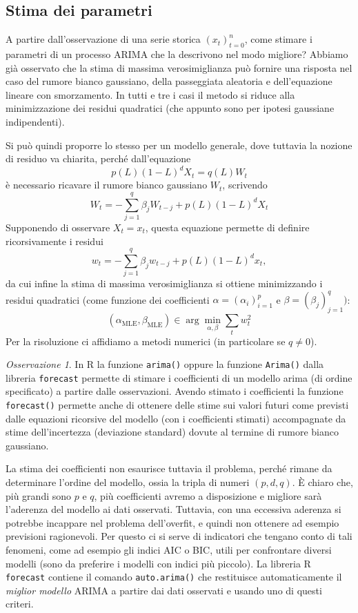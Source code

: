 \documentclass[
  italian,
  letterpaper,
]{book}
\newcommand{\mle}{\operatorname{MLE}}
\theoremstyle{definition}
\theoremstyle{remark}
\newtheorem*{remark}{Osservazione}
\begin{document}
\subsection{Stima dei parametri}\label{stima-dei-parametri}

A partire dall'osservazione di una serie storica \((x_t)_{t=0}^n\), come
stimare i parametri di un processo ARIMA che la descrivono nel modo
migliore? Abbiamo già osservato che la stima di massima verosimiglianza
può fornire una risposta nel caso del rumore bianco gaussiano, della
passeggiata aleatoria e dell'equazione lineare con smorzamento. In tutti
e tre i casi il metodo si riduce alla minimizzazione dei residui
quadratici (che appunto sono per ipotesi gaussiane indipendenti).

Si può quindi proporre lo stesso per un modello generale, dove tuttavia
la nozione di residuo va chiarita, perché dall'equazione
\[ p(L)(1-L)^d X_t = q(L)W_t\] è necessario ricavare il rumore bianco
gaussiano \(W_t\), scrivendo
\[ W_t = - \sum_{j=1}^q \beta_j W_{t-j} +p(L)(1-L)^dX_t\] Supponendo di
osservare \(X_t = x_t\), questa equazione permette di definire
ricorsivamente i residui
\[ w_t = - \sum_{j=1}^q \beta_j w_{t-j} + p(L)(1-L)^d x_t,\] da cui
infine la stima di massima verosimiglianza si ottiene minimizzando i
residui quadratici (come funzione dei coefficienti
\(\alpha = (\alpha_i)_{i=1}^p\) e \(\beta = (\beta_j)_{j=1}^q)\):
\[ (\alpha_{\mle}, \beta_{\mle}) \in \operatorname{arg} \min_{\alpha, \beta} \sum_{t} w_t^2\]
Per la risoluzione ci affidiamo a metodi numerici (in particolare se
\(q\neq 0\)).

\begin{remark}
In R la funzione \texttt{arima()} oppure la funzione \texttt{Arima()}
dalla libreria \texttt{forecast} permette di stimare i coefficienti di
un modello arima (di ordine specificato) a partire dalle osservazioni.
Avendo stimato i coefficienti la funzione \texttt{forecast()} permette
anche di ottenere delle stime sui valori futuri come previsti dalle
equazioni ricorsive del modello (con i coefficienti stimati)
accompagnate da stime dell'incertezza (deviazione standard) dovute al
termine di rumore bianco gaussiano.
\end{remark}

La stima dei coefficienti non esaurisce tuttavia il problema, perché
rimane da determinare l'ordine del modello, ossia la tripla di numeri
\((p,d,q)\). È chiaro che, più grandi sono \(p\) e \(q\), più
coefficienti avremo a disposizione e migliore sarà l'aderenza del
modello ai dati osservati. Tuttavia, con una eccessiva aderenza si
potrebbe incappare nel problema dell'overfit, e quindi non ottenere ad
esempio previsioni ragionevoli. Per questo ci si serve di indicatori che
tengano conto di tali fenomeni, come ad esempio gli indici AIC o BIC,
utili per confrontare diversi modelli (sono da preferire i modelli con
indici più piccolo). La libreria R \texttt{forecast} contiene il comando
\texttt{auto.arima()} che restituisce automaticamente il \emph{miglior
modello} ARIMA a partire dai dati osservati e usando uno di questi
criteri.
\end{document}
